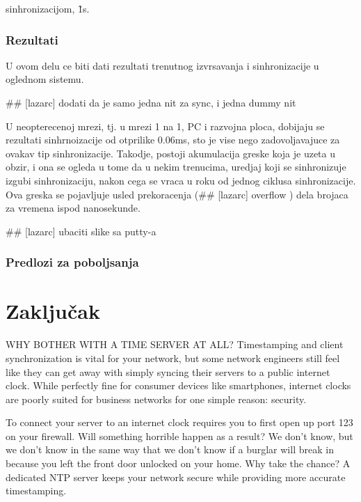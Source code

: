 \documentclass[a4paper,12pt, master]{etf}
\begin{document}
        sinhronizacijom, \~1s.

        \subsection{Rezultati}

        U ovom delu ce biti dati rezultati trenutnog izvrsavanja i sinhronizacije u oglednom sistemu.

        \#\# [lazarc] dodati da je samo jedna nit za sync, i jedna dummy nit

        U neopterecenoj mrezi, tj\@. u mrezi 1 na 1, PC i razvojna ploca, dobijaju se rezultati sinhrnoizacije od
        otprilike 0.06ms, sto je vise nego zadovoljavajuce za ovakav tip sinhronizacije. Takodje, postoji
        akumulacija greske koja je uzeta u obzir, i ona se ogleda u tome da u nekim trenucima, uredjaj koji se
        sinhronizuje izgubi sinhronizaciju, nakon cega se vraca u roku od jednog ciklusa sinhronizacije. Ova
        greska se pojavljuje usled prekoracenja (\#\# [lazarc] overflow ) dela brojaca za vremena ispod
        nanosekunde.

        \#\# [lazarc] ubaciti slike sa putty-a

        \subsection{Predlozi za poboljsanja}

	\newpage

	\chapter{Zaključak}

	WHY BOTHER WITH A TIME SERVER AT ALL\@?
	Timestamping and client synchronization is vital for your network, but some network
	engineers still feel like they can get away with simply syncing their servers to a public
	internet clock. While perfectly fine for consumer devices like smartphones, internet
	clocks are poorly suited for business networks for one simple reason: security.

	To connect your server to an internet clock requires you to first open up port 123 on
	your firewall. Will something horrible happen as a result? We don't know, but we don't
	know in the same way that we don't know if a burglar will break in because you left the
	front door unlocked on your home. Why take the chance? A dedicated NTP server keeps your
	network secure while providing more accurate timestamping.
\end{document}

